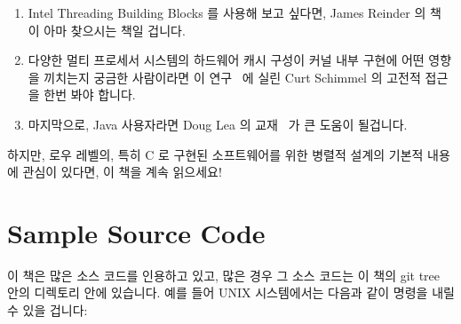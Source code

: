 \begin{enumerate}
\item	Intel Threading Building Blocks 를 사용해 보고 싶다면, James Reinder 의
	책~\cite{Reinders2007Textbook} 이 아마 찾으시는 책일 겁니다.

\iffalse
\item	If you want to try out Intel Threading Building Blocks,
	then perhaps James Reinders's book~\cite{Reinders2007Textbook}
	is what you are looking for.
\fi

\item	다양한 멀티 프로세서 시스템의 하드웨어 캐시 구성이 커널 내부 구현에
	어떤 영향을 끼치는지 궁금한 사람이라면 이
	연구~\cite{Schimmel:1994:USM:175689} 에 실린 Curt Schimmel 의 고전적
	접근을 한번 봐야 합니다.

\iffalse
\item	Those interested in learning how various types of multi-processor
	hardware
	cache organizations affect the implementation of kernel
	internals should take a look at Curt Schimmel's classic
	treatment of this subject~\cite{Schimmel:1994:USM:175689}.
\fi

\item	마지막으로, Java 사용자라면 Doug Lea 의
	교재~\cite{DougLea1997Textbook,Goetz2007Textbook} 가 큰 도움이
	될겁니다.

\iffalse
\item	Finally, those using Java might be well-served by Doug Lea's
	textbooks~\cite{DougLea1997Textbook,Goetz2007Textbook}.
\fi

\end{enumerate}

하지만, 로우 레벨의, 특히 C 로 구현된 소프트웨어를 위한 병렬적 설계의 기본적
내용에 관심이 있다면, 이 책을 계속 읽으세요!

\iffalse
However, if you are interested in principles of parallel design
for low-level software, especially software written in C, read on!
\fi

\section{Sample Source Code}
\label{sec:howto:Sample Source Code}

이 책은 많은 소스 코드를 인용하고 있고, 많은 경우 그 소스 코드는 이 책의 git
tree 안의  디렉토리 안에 있습니다.
예를 들어 UNIX 시스템에서는 다음과 같이 명령을 내릴 수 있을 겁니다:

\iffalse
This book discusses its fair share of source code, and in many cases
this source code may be found in the \co{CodeSamples} directory
of this book's git tree.
For example, on UNIX systems, you should be able to type the following:
\fi


